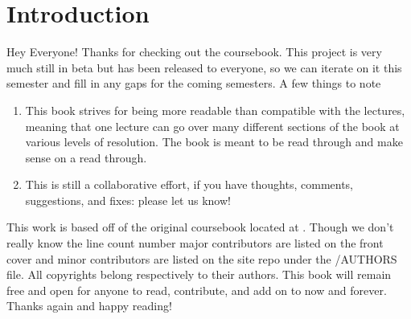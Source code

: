 \chapter{Introduction}

Hey Everyone! Thanks for checking out the coursebook.
This project is very much still in beta but has been released to everyone, so we can iterate on it this semester and fill in any gaps for the coming semesters.
A few things to note

\begin{enumerate}
	\item This book strives for being more readable than compatible with the lectures, meaning that one lecture can go over many different sections of the book at various levels of resolution. The book is meant to be read through and make sense on a read through.
	\item This is still a collaborative effort, if you have thoughts, comments, suggestions, and fixes: please let us know!
\end{enumerate}

This work is based off of the original coursebook located at .
Though we don't really know the line count number major contributors are listed on the front cover and minor contributors are listed on the site repo under the /AUTHORS file.
All copyrights belong respectively to their authors.
This book will remain free and open for anyone to read, contribute, and add on to now and forever.
Thanks again and happy reading!
